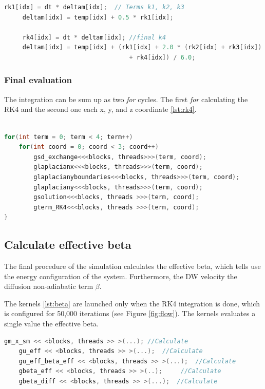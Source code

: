 \begin{lstlisting}[language=C++, label={lst:rkcuda}, caption={Runge and Kutta 4th Terms}]
     rk1[idx] = dt * deltam[idx];  // Terms k1, k2, k3
     deltam[idx] = temp[idx] + 0.5 * rk1[idx];
     
     rk4[idx] = dt * deltam[idx]; //final k4
     deltam[idx] = temp[idx] + (rk1[idx] + 2.0 * (rk2[idx] + rk3[idx])
                                  + rk4[idx]) / 6.0;
\end{lstlisting}


\subsubsection{Final evaluation}

The integration can be sum up as two \textit{for} cycles. The first \textit{for} calculating the RK4 and the second one each x, y, and z coordinate \ref{lst:rk4}.

\begin{lstlisting}[language=C++, label={lst:rk4}, caption={Summarize of Runge and Kutta 4th Integration}]	

for(int term = 0; term < 4; term++)
	for(int coord = 0; coord < 3; coord++)
    	gsd_exchange<<<blocks, threads>>>(term, coord);
    	glaplacianx<<<blocks, threads>>>(term, coord);
    	glaplacianyboundaries<<<blocks, threads>>>(term, coord);
    	glaplaciany<<<blocks, threads>>>(term, coord);
    	gsolution<<<blocks, threads >>>(term, coord);
    	gterm_RK4<<<blocks, threads >>>(term, coord);
}
\end{lstlisting}


\subsection{Calculate effective beta}

The final procedure of the simulation calculates the effective beta, which tells use the energy configuration of the system. Furthermore, the DW velocity the diffusion non-adiabatic term $\beta$.

The kernels \ref{lst:beta} are launched only when the RK4 integration is done, which is configured for 50,000 iterations (see Figure \ref{fig:flow}). The kernels evaluates a single value the effective beta.

\begin{lstlisting}[language=C++, label={lst:beta}, caption={Calculate effective beta}]
    gm_x_sm << <blocks, threads >> >(...); //Calculate
    gu_eff << <blocks, threads >> >(...);  //Calculate 
    gu_eff_beta_eff << <blocks, threads >> >(...); 	//Calculate
    gbeta_eff << <blocks, threads >> >(..); 	//Calculate
    gbeta_diff << <blocks, threads >> >(...);  //Calculate             
\end{lstlisting}


